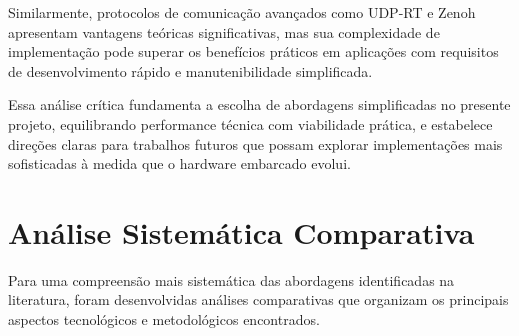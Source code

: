 Similarmente, protocolos de comunicação avançados como UDP-RT e Zenoh apresentam vantagens teóricas significativas, mas sua complexidade de implementação pode superar os benefícios práticos em aplicações com requisitos de desenvolvimento rápido e manutenibilidade simplificada.

Essa análise crítica fundamenta a escolha de abordagens simplificadas no presente projeto, equilibrando performance técnica com viabilidade prática, e estabelece direções claras para trabalhos futuros que possam explorar implementações mais sofisticadas à medida que o hardware embarcado evolui.

\section{Análise Sistemática Comparativa}
\label{sec:analise-sistematica}

Para uma compreensão mais sistemática das abordagens identificadas na literatura, foram desenvolvidas análises comparativas que organizam os principais aspectos tecnológicos e metodológicos encontrados.

\begin{table}[!ht]
\captionsetup{width=16cm}
\end{table}

